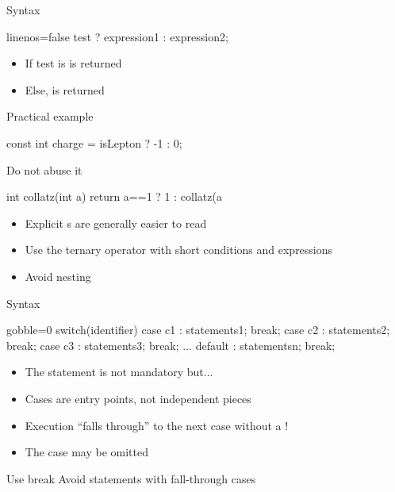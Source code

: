 \begin{frame}[fragile]
  \begin{block}{Syntax}
    \begin{cppcode*}{linenos=false}
      test ? expression1 : expression2;
    \end{cppcode*}
    \vspace{-0.2cm}
    \begin{itemize}
      \item If test is   is returned
      \item Else,  is returned
    \end{itemize}
  \end{block}
  \pause
  \begin{exampleblock}{Practical example}
    \begin{cppcode*}{}
      const int charge = isLepton ? -1 : 0;
    \end{cppcode*}
  \end{exampleblock}
  \pause
  \begin{alertblock}{Do not abuse it}
    \begin{cppcode*}{}
      int collatz(int a) {
        return a==1 ? 1 : collatz(a%
      }
    \end{cppcode*}
    \begin{itemize}
      \item Explicit s are generally easier to read
      \item Use the ternary operator with short conditions and expressions
      \item Avoid nesting
    \end{itemize}
  \end{alertblock}
\end{frame}

\begin{frame}[fragile]
  \begin{block}{Syntax}
    \begin{cppcode*}{gobble=0}
      switch(identifier) {
        case c1 : statements1; break;
        case c2 : statements2; break;
        case c3 : statements3; break;
        ...
        default : statementsn; break;
      }
    \end{cppcode*}
    \begin{itemize}
      \item The  statement is not mandatory but...
      \item Cases are entry points, not independent pieces
      \item Execution ``falls through'' to the next case without a !
      \item The  case may be omitted
    \end{itemize}
  \end{block}
  \pause
  \begin{alertblock}{Use break}
    Avoid  statements with fall-through cases
  \end{alertblock}
\end{frame}

